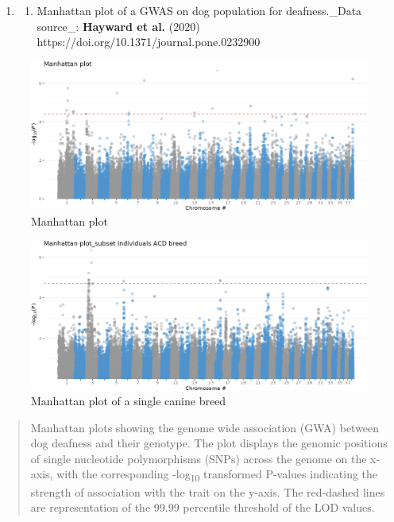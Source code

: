 \begin{enumerate}
\def\labelenumi{\arabic{enumi}.}
\item
  \begin{enumerate}
  \def\labelenumii{\alph{enumii}.}
  \tightlist
  \item
    Manhattan plot of a GWAS on dog population for deafness.\_Data
    source\_: \textbf{Hayward et al.} (2020)
    https://doi.org/10.1371/journal.pone.0232900
  \end{enumerate}
\end{enumerate}

\begin{figure}
\centering
\includegraphics[width=\linewidth]{Figures/manhattan_dogs.png}
\caption{Manhattan plot}
\end{figure}

\begin{figure}
\centering
\includegraphics[width=\linewidth]{Figures/manhattan_filter_acd.png}
\caption{Manhattan plot of a single canine breed}
\end{figure}

\begin{quote}
Manhattan plots showing the genome wide association (GWA) between dog
deafness and their genotype. The plot displays the genomic positions of
single nucleotide polymorphisms (SNPs) across the genome on the x-axis,
with the corresponding -log\textsubscript{10} transformed P-values
indicating the strength of association with the trait on the y-axis. The
red-dashed lines are representation of the 99.99 percentile threshold of
the LOD values.
\end{quote}

